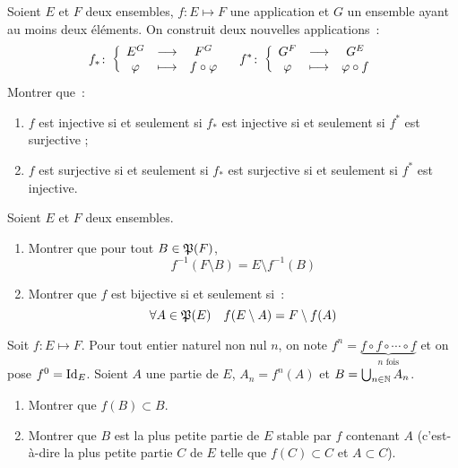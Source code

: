 \begin{exercice}
    Soient \(E\) et \(F\) deux ensembles, \(f : E \longmapsto F\) une application et \(G\) un ensemble ayant au moins deux éléments. On construit deux nouvelles applications~:
    \begin{equation}
        f_{*}\colon \left\{\begin{array}{ccc} E^G & \longrightarrow &F^G\\ \varphi & \longmapsto & f \circ \varphi \end{array} \right. \quad f^{*}\colon \left\{\begin{array}{ccc} G^F & \longrightarrow &G^E\\ \varphi & \longmapsto & \varphi \circ f \end{array} \right.
    \end{equation}
    Montrer que~:
    \begin{enumerate}
        \item \(f\) est injective si et seulement si \(f_{*}\) est injective si et seulement si \(f^{*}\) est surjective ;
        \item \(f\) est surjective si et seulement si \(f_{*}\) est surjective si et seulement si \(f^{*}\) est injective.
    \end{enumerate}
\end{exercice}
\begin{exercice}
    Soient \(E\) et \(F\) deux ensembles.
    \begin{enumerate}
        \item Montrer que pour tout \(B \in \mathfrak{P}(F)\),
            \begin{equation}
                f^{-1}(F\setminus B) = E \setminus f^{-1}(B)
            \end{equation}
        \item Montrer que \(f\) est bijective si et seulement si~:
            \begin{equation}
                \forall A \in \mathfrak{P}(E) \quad f(E\setminus A) = F\setminus f(A)
            \end{equation}
    \end{enumerate}
\end{exercice}
\begin{exercice}
    Soit \(f : E \longmapsto F\). Pour tout entier naturel non nul \(n\), on note \(f^n = \underbrace{f \circ f \circ \cdots \circ f}_{n \textrm{ fois}}\) et on pose \(f^0=\operatorname{Id}_E\). Soient \(A\) une partie de \(E\), \(A_n=f^{n}(A)\) et \(B = \bigcup_{n\in \mathbb{N}} A_n\).
    \begin{enumerate}
        \item Montrer que \(f(B) \subset B\).
        \item Montrer que \(B\) est la plus petite partie de \(E\) stable par \(f\) contenant \(A\) (c'est-à-dire la plus petite partie \(C\) de \(E\) telle que \(f(C) \subset C\) et \(A \subset C\)).
    \end{enumerate}
\end{exercice}

